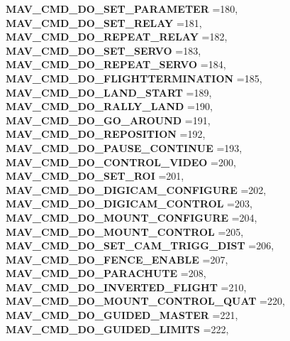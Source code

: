 \begin{DoxyCompactItemize}
\textbf{ M\+A\+V\+\_\+\+C\+M\+D\+\_\+\+D\+O\+\_\+\+S\+E\+T\+\_\+\+P\+A\+R\+A\+M\+E\+T\+ER} =180, 
\newline
\textbf{ M\+A\+V\+\_\+\+C\+M\+D\+\_\+\+D\+O\+\_\+\+S\+E\+T\+\_\+\+R\+E\+L\+AY} =181, 
\textbf{ M\+A\+V\+\_\+\+C\+M\+D\+\_\+\+D\+O\+\_\+\+R\+E\+P\+E\+A\+T\+\_\+\+R\+E\+L\+AY} =182, 
\textbf{ M\+A\+V\+\_\+\+C\+M\+D\+\_\+\+D\+O\+\_\+\+S\+E\+T\+\_\+\+S\+E\+R\+VO} =183, 
\textbf{ M\+A\+V\+\_\+\+C\+M\+D\+\_\+\+D\+O\+\_\+\+R\+E\+P\+E\+A\+T\+\_\+\+S\+E\+R\+VO} =184, 
\newline
\textbf{ M\+A\+V\+\_\+\+C\+M\+D\+\_\+\+D\+O\+\_\+\+F\+L\+I\+G\+H\+T\+T\+E\+R\+M\+I\+N\+A\+T\+I\+ON} =185, 
\textbf{ M\+A\+V\+\_\+\+C\+M\+D\+\_\+\+D\+O\+\_\+\+L\+A\+N\+D\+\_\+\+S\+T\+A\+RT} =189, 
\textbf{ M\+A\+V\+\_\+\+C\+M\+D\+\_\+\+D\+O\+\_\+\+R\+A\+L\+L\+Y\+\_\+\+L\+A\+ND} =190, 
\textbf{ M\+A\+V\+\_\+\+C\+M\+D\+\_\+\+D\+O\+\_\+\+G\+O\+\_\+\+A\+R\+O\+U\+ND} =191, 
\newline
\textbf{ M\+A\+V\+\_\+\+C\+M\+D\+\_\+\+D\+O\+\_\+\+R\+E\+P\+O\+S\+I\+T\+I\+ON} =192, 
\textbf{ M\+A\+V\+\_\+\+C\+M\+D\+\_\+\+D\+O\+\_\+\+P\+A\+U\+S\+E\+\_\+\+C\+O\+N\+T\+I\+N\+UE} =193, 
\textbf{ M\+A\+V\+\_\+\+C\+M\+D\+\_\+\+D\+O\+\_\+\+C\+O\+N\+T\+R\+O\+L\+\_\+\+V\+I\+D\+EO} =200, 
\textbf{ M\+A\+V\+\_\+\+C\+M\+D\+\_\+\+D\+O\+\_\+\+S\+E\+T\+\_\+\+R\+OI} =201, 
\newline
\textbf{ M\+A\+V\+\_\+\+C\+M\+D\+\_\+\+D\+O\+\_\+\+D\+I\+G\+I\+C\+A\+M\+\_\+\+C\+O\+N\+F\+I\+G\+U\+RE} =202, 
\textbf{ M\+A\+V\+\_\+\+C\+M\+D\+\_\+\+D\+O\+\_\+\+D\+I\+G\+I\+C\+A\+M\+\_\+\+C\+O\+N\+T\+R\+OL} =203, 
\textbf{ M\+A\+V\+\_\+\+C\+M\+D\+\_\+\+D\+O\+\_\+\+M\+O\+U\+N\+T\+\_\+\+C\+O\+N\+F\+I\+G\+U\+RE} =204, 
\textbf{ M\+A\+V\+\_\+\+C\+M\+D\+\_\+\+D\+O\+\_\+\+M\+O\+U\+N\+T\+\_\+\+C\+O\+N\+T\+R\+OL} =205, 
\newline
\textbf{ M\+A\+V\+\_\+\+C\+M\+D\+\_\+\+D\+O\+\_\+\+S\+E\+T\+\_\+\+C\+A\+M\+\_\+\+T\+R\+I\+G\+G\+\_\+\+D\+I\+ST} =206, 
\textbf{ M\+A\+V\+\_\+\+C\+M\+D\+\_\+\+D\+O\+\_\+\+F\+E\+N\+C\+E\+\_\+\+E\+N\+A\+B\+LE} =207, 
\textbf{ M\+A\+V\+\_\+\+C\+M\+D\+\_\+\+D\+O\+\_\+\+P\+A\+R\+A\+C\+H\+U\+TE} =208, 
\textbf{ M\+A\+V\+\_\+\+C\+M\+D\+\_\+\+D\+O\+\_\+\+I\+N\+V\+E\+R\+T\+E\+D\+\_\+\+F\+L\+I\+G\+HT} =210, 
\newline
\textbf{ M\+A\+V\+\_\+\+C\+M\+D\+\_\+\+D\+O\+\_\+\+M\+O\+U\+N\+T\+\_\+\+C\+O\+N\+T\+R\+O\+L\+\_\+\+Q\+U\+AT} =220, 
\textbf{ M\+A\+V\+\_\+\+C\+M\+D\+\_\+\+D\+O\+\_\+\+G\+U\+I\+D\+E\+D\+\_\+\+M\+A\+S\+T\+ER} =221, 
\textbf{ M\+A\+V\+\_\+\+C\+M\+D\+\_\+\+D\+O\+\_\+\+G\+U\+I\+D\+E\+D\+\_\+\+L\+I\+M\+I\+TS} =222, 

\end{DoxyCompactItemize}
